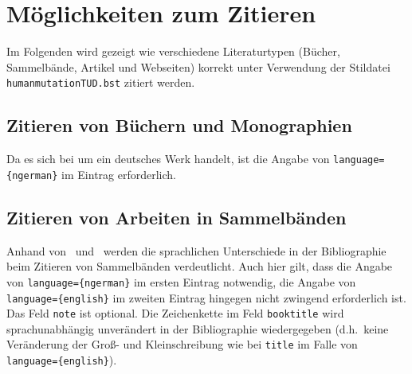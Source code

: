 \documentclass[a4paper,10pt]{scrartcl}
\begin{document}
\section{Möglichkeiten zum Zitieren}
Im Folgenden wird gezeigt wie verschiedene Literaturtypen (Bücher,
Sammelbände, Artikel und Webseiten) korrekt unter Verwendung der Stildatei
\verb|humanmutationTUD.bst| zitiert werden.
\subsection{Zitieren von Büchern und Monographien}
Da es sich bei  um ein deutsches Werk handelt, ist
die Angabe von \verb|language={ngerman}| im Eintrag erforderlich.


\subsection{Zitieren von Arbeiten in Sammelbänden}
Anhand von~ und~ werden
die sprachlichen Unterschiede in der Bibliographie beim Zitieren von
Sammelb\"anden verdeutlicht. Auch hier gilt, dass die Angabe von
\verb|language={ngerman}| im ersten Eintrag notwendig, die Angabe von
\verb|language={english}| im zweiten Eintrag hingegen nicht zwingend
erforderlich ist. Das Feld \verb|note| ist optional. Die Zeichenkette im Feld
\verb|booktitle| wird sprachunabhängig unverändert in der Bibliographie
wiedergegeben (d.h.\ keine Veränderung der Gro{\ss}- und Kleinschreibung wie bei
\verb|title| im Falle von \verb|language={english}|).
\end{document}
